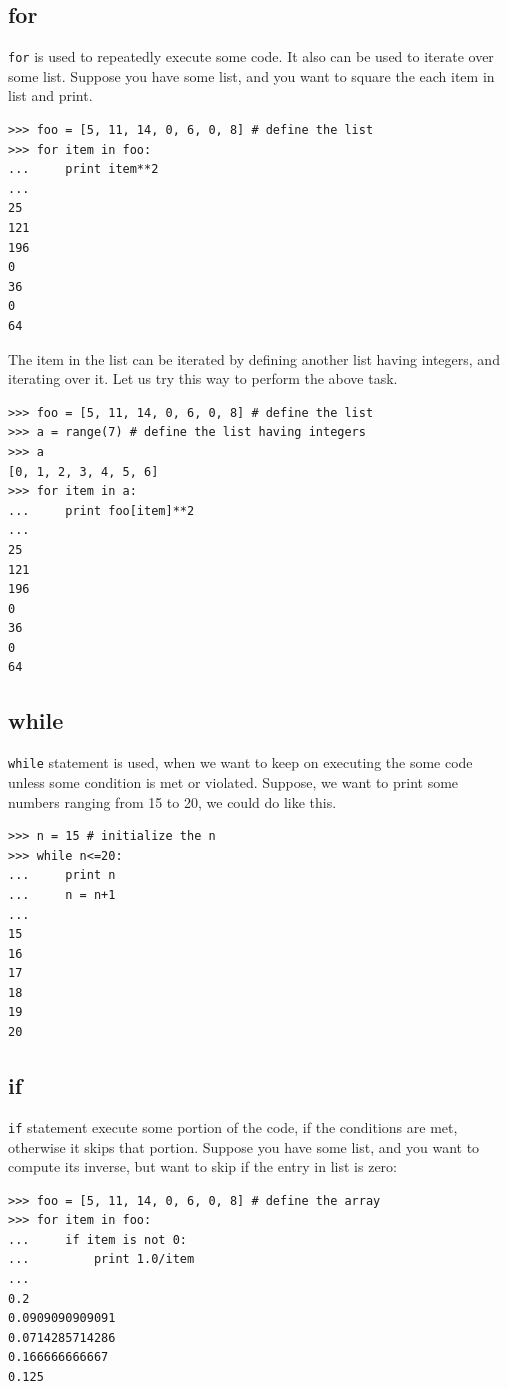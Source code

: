 \documentclass[10pt]{book}
\begin{document}
{\subsection{for}
\verb"for" is used to repeatedly execute some code. It also can be used to iterate over some list. Suppose you have some list, and you want to square the each item in list and print.
\beforeverb
\begin{verbatim}
>>> foo = [5, 11, 14, 0, 6, 0, 8] # define the list
>>> for item in foo:
...     print item**2
... 
25
121
196
0
36
0
64
\end{verbatim}
\afterverb
{}

The item in the list can be iterated by defining another list having integers, and iterating over it. Let us try this way to perform the above task. 
\beforeverb
\begin{verbatim}
>>> foo = [5, 11, 14, 0, 6, 0, 8] # define the list
>>> a = range(7) # define the list having integers
>>> a
[0, 1, 2, 3, 4, 5, 6]
>>> for item in a:
...     print foo[item]**2
... 
25
121
196
0
36
0
64
\end{verbatim}
\afterverb

\subsection{while}
\verb"while" statement is used, when we want to keep on executing the some code unless some condition is met or violated. Suppose, we want to print some numbers ranging from 15 to 20, we could do like this.
\beforeverb
\begin{verbatim}
>>> n = 15 # initialize the n
>>> while n<=20:
...     print n
...     n = n+1
... 
15
16
17
18
19
20
\end{verbatim}
\afterverb
{}

\subsection{if}
\verb"if" statement execute some portion of the code, if the conditions are met, otherwise it skips that portion. Suppose you have some list, and you want to compute its inverse, but want to skip if the entry in list is zero:
\beforeverb
\begin{verbatim}
>>> foo = [5, 11, 14, 0, 6, 0, 8] # define the array
>>> for item in foo:
...     if item is not 0:
...         print 1.0/item
... 
0.2
0.0909090909091
0.0714285714286
0.166666666667
0.125
\end{verbatim}
\afterverb
{}

}
\end{document}
